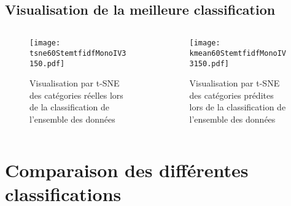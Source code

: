 \documentclass[8pt,aspectratio=169,hyperref={unicode=true}]{beamer}
\begin{document}
\subsection{Visualisation de la meilleure classification}
\begin{frame}{\insertsubsection}
    \begin{columns}
        \begin{column}{.5\textwidth}
            \begin{figure}
                \texttt{[image: tsne60StemtfidfMonoIV3150.pdf]}
                \caption{Visualisation par t-SNE des catégories réelles lors de la classification de l'ensemble des données}
            \end{figure}
        \end{column}
        \begin{column}{.5\textwidth}
            \begin{figure}
                \texttt{[image: kmean60StemtfidfMonoIV3150.pdf]}
                \caption{Visualisation par t-SNE des catégories prédites lors de la classification de l'ensemble des données}
            \end{figure}
        \end{column}
    \end{columns}
\end{frame}

\section{Comparaison des différentes classifications}
\end{document}
